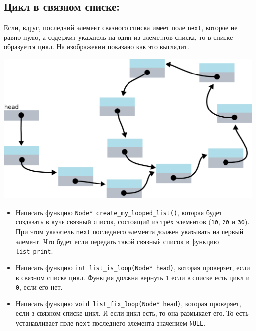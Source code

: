 \documentclass{article}
\begin{document}
\subsection*{Цикл в связном списке:}
Если, вдруг, последний элемент связного списка имеет поле \texttt{next}, которое не равно нулю, а содержит указатель на один из элементов списка, то в списке образуется цикл. На изображении показано как это выглядит. 
\begin{center}
\includegraphics[scale=0.77]{../images/list_loop_2.png}
\end{center}

\begin{itemize}
\item Написать функцию \texttt{Node* create\_my\_looped\_list()}, которая будет создавать в куче связный список, состоящий из трёх элементов (\texttt{10}, \texttt{20} и \texttt{30}). При этом указатель \texttt{next} последнего элемента должен указывать на первый элемент. Что будет если передать такой связный список в функцию \texttt{list\_print}.
\item Написать функцию \texttt{int list\_is\_loop(Node* head)}, которая проверяет, если в связном списке цикл. Функция должна вернуть \texttt{1} если в списке есть цикл и \texttt{0}, если его нет.
\item Написать функцию \texttt{void list\_fix\_loop(Node* head)}, которая проверяет, если в связном списке цикл. И если цикл есть, то она размыкает его. То есть устанавливает поле \texttt{next} последнего элемента значением \texttt{NULL}.
\end{itemize}
\end{document}
